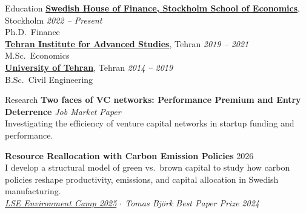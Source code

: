 \documentclass{resume}
\begin{document}
\begin{rSection}{Education}
  \vspace{-2pt}
  {\bf \href{https://www.hhs.se/en/houseoffinance/}{Swedish House of Finance, Stockholm School of Economics}}, Stockholm \hfill {\em 2022 -- Present} \\
  Ph.D.\ Finance \\[-4pt]
  {\bf \href{https://teias.institute/}{Tehran Institute for Advanced Studies}}, Tehran \hfill {\em 2019 -- 2021} \\
  M.Sc.\ Economics \\[-4pt]
  {\bf \href{https://www.ut.ac.ir/en}{University of Tehran}}, Tehran \hfill {\em 2014 -- 2019} \\
  B.Sc.\ Civil Engineering
\end{rSection}


\begin{rSection}{Research}
  \vspace{2pt}
  {\bf Two faces of VC networks: Performance Premium and Entry Deterrence} \hfill {\em Job Market Paper} \\[-2pt]
  {\small Investigating the efficiency of venture capital networks in startup funding and performance.}
  \vspace{4pt}

  {\bf Resource Reallocation with Carbon Emission Policies} \hfill {2026} \\[-2pt]
  {\small I develop a structural model of green vs.\ brown capital to study how carbon policies reshape productivity, emissions, and capital allocation in Swedish manufacturing.} \\[0pt]
  {\small {\em \href{https://www.lse-environment-week.com/environment-camp-2025}{LSE Environment Camp 2025} $\cdot$ Tomas Bj\"{o}rk Best Paper Prize 2024}}
  \vspace{4pt}

\end{rSection}
\end{document}
